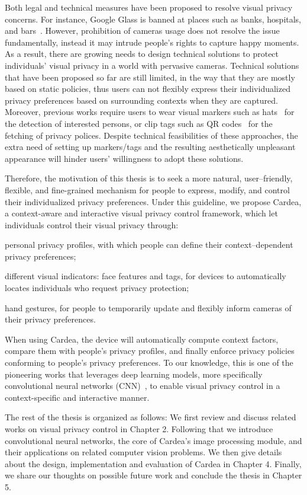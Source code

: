 Both legal and technical measures have been proposed to resolve visual privacy concerns. For instance, Google Glass is banned at places such as banks, hospitals, and bars~\cite{links:glassbanned}. However, prohibition of cameras usage does not resolve the issue fundamentally, instead it may intrude people's rights to capture happy moments. As a result, there are growing needs to design technical solutions to protect individuals' visual privacy in a world with pervasive cameras. Technical solutions that have been proposed so far are still limited, in the way that they are mostly based on static policies, thus users can not flexibly express their individualized privacy preferences based on surrounding contexts when they are captured. Moreover, previous works require users to wear visual markers such as hats~\cite{schiff2009respectful} for the detection of interested persons, or clip tags such as QR codes~\cite{bo2014privacy,roesner2014world} for the fetching of privacy polices. Despite technical feasibilities of these approaches, the extra need of setting up markers/tags and the resulting aesthetically unpleasant appearance will hinder users' willingness to adopt these solutions.

Therefore, the motivation of this thesis is to seek a more natural, user–friendly, flexible, and fine-grained mechanism for people to express, modify, and control their individualized privacy preferences. Under this guideline, we propose Cardea, a context-aware and interactive visual privacy control framework, which let individuals control their visual privacy through:
\begin{inparaenum}
\item personal privacy profiles, with which people can define their context--dependent privacy preferences;
\item different visual indicators: face features and tags, for devices to automatically locates individuals who request privacy protection;
\item hand gestures, for people to temporarily update and flexibly inform cameras of their privacy preferences.
\end{inparaenum}
When using Cardea, the device will automatically compute context factors, compare them with people’s privacy profiles, and finally enforce privacy policies conforming to people’s privacy preferences. To our knowledge, this is one of the pioneering works that leverages deep learning models, more specifically convolutional neural networks (CNN)~\cite{lecun1998gradient}, to enable visual privacy control in a context-specific and interactive manner.

The rest of the thesis is organized as follows: We first review and discuss related works on visual privacy control in Chapter 2. Following that we introduce convolutional neural networks, the core of Cardea's image processing module, and their applications on related computer vision problems. We then give details about the design, implementation and evaluation of Cardea in Chapter 4. Finally, we share our thoughts on possible future work and conclude the thesis in Chapter 5.

\newpage
